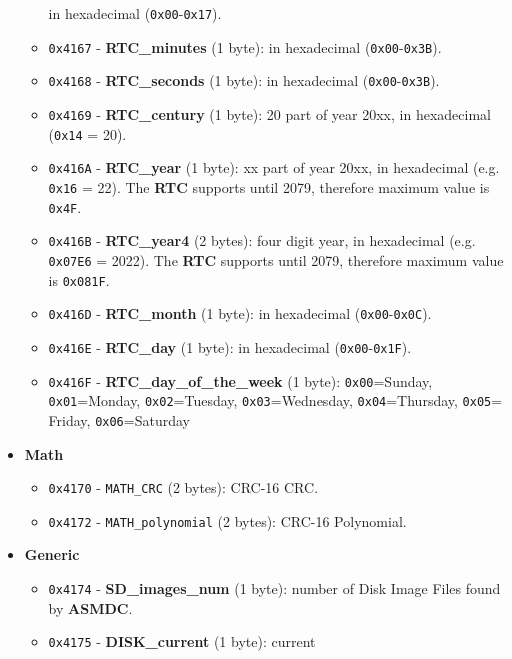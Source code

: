 \documentclass[a4paper,11pt]{article}
\begin{document}
\begin{itemize}
\begin{itemize}
            in hexadecimal (\texttt{0x00}-\texttt{0x17}).
            \item \texttt{0x4167} - \textbf{RTC\_minutes} (1 byte): in
            hexadecimal (\texttt{0x00}-\texttt{0x3B}).
            \item \texttt{0x4168} - \textbf{RTC\_seconds} (1 byte): in
            hexadecimal (\texttt{0x00}-\texttt{0x3B}).
            \item \texttt{0x4169} - \textbf{RTC\_century} (1 byte): 20 part of
            year 20xx, in hexadecimal (\texttt{0x14} = 20).
            \item \texttt{0x416A} - \textbf{RTC\_year} (1 byte): xx part of
            year 20xx, in hexadecimal (e.g. \texttt{0x16} = 22). The \textbf{RTC}
            supports until 2079, therefore maximum value is \texttt{0x4F}.
            \item \texttt{0x416B} - \textbf{RTC\_year4} (2 bytes): four digit
            year, in hexadecimal (e.g. \texttt{0x07E6} = 2022). The \textbf{RTC}
            supports until 2079, therefore maximum value is \texttt{0x081F}.
            \item \texttt{0x416D} - \textbf{RTC\_month} (1 byte): in
            hexadecimal (\texttt{0x00}-\texttt{0x0C}).
            \item \texttt{0x416E} - \textbf{RTC\_day} (1 byte): in hexadecimal
            (\texttt{0x00}-\texttt{0x1F}).
            \item \texttt{0x416F} - \textbf{RTC\_day\_of\_the\_week} (1 byte):
            \texttt{0x00}=Sunday, \texttt{0x01}=Monday, \texttt{0x02}=Tuesday,
            \texttt{0x03}=Wednesday, \texttt{0x04}=Thursday, \texttt{0x05}=
            Friday, \texttt{0x06}=Saturday
        \end{itemize}
        \item \textbf{Math}
        \begin{itemize}
            \item \texttt{0x4170} - \texttt{MATH\_CRC} (2 bytes): CRC-16 CRC.
            \item \texttt{0x4172} - \texttt{MATH\_polynomial} (2 bytes): CRC-16
            Polynomial.
        \end{itemize}
        \item \textbf{Generic}
        \begin{itemize}
            \item \texttt{0x4174} - \textbf{SD\_images\_num} (1 byte): number
            of Disk Image Files found by \textbf{ASMDC}.
            \item \texttt{0x4175} - \textbf{DISK\_current} (1 byte): current 

\end{itemize}
\end{itemize}
\end{document}
